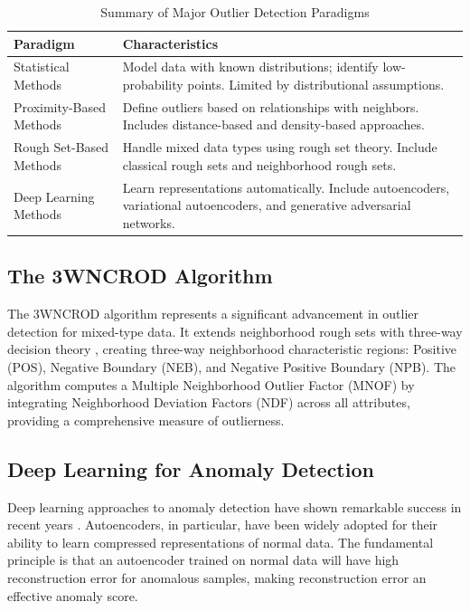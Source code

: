 \documentclass[12pt,a4paper]{article}
\begin{document}
\begin{table}[h]
\centering
\caption{Summary of Major Outlier Detection Paradigms}
\label{tab:paradigms}
\begin{tabular}{|p{3cm}|p{10cm}|}
\hline
\textbf{Paradigm} & \textbf{Characteristics} \\
\hline
Statistical Methods & Model data with known distributions; identify low-probability points. Limited by distributional assumptions. \\
\hline
Proximity-Based Methods & Define outliers based on relationships with neighbors. Includes distance-based and density-based approaches. \\
\hline
Rough Set-Based Methods & Handle mixed data types using rough set theory. Include classical rough sets and neighborhood rough sets. \\
\hline
Deep Learning Methods & Learn representations automatically. Include autoencoders, variational autoencoders, and generative adversarial networks. \\
\hline
\end{tabular}
\end{table}

\subsection{The 3WNCROD Algorithm}

The 3WNCROD algorithm \cite{zhang2024} represents a significant advancement in outlier detection for mixed-type data. It extends neighborhood rough sets with three-way decision theory \cite{yao2016}, creating three-way neighborhood characteristic regions: Positive (POS), Negative Boundary (NEB), and Negative Positive Boundary (NPB). The algorithm computes a Multiple Neighborhood Outlier Factor (MNOF) by integrating Neighborhood Deviation Factors (NDF) across all attributes, providing a comprehensive measure of outlierness.

\subsection{Deep Learning for Anomaly Detection}

Deep learning approaches to anomaly detection have shown remarkable success in recent years \cite{pang2021}. Autoencoders, in particular, have been widely adopted for their ability to learn compressed representations of normal data. The fundamental principle is that an autoencoder trained on normal data will have high reconstruction error for anomalous samples, making reconstruction error an effective anomaly score.
\end{document}
